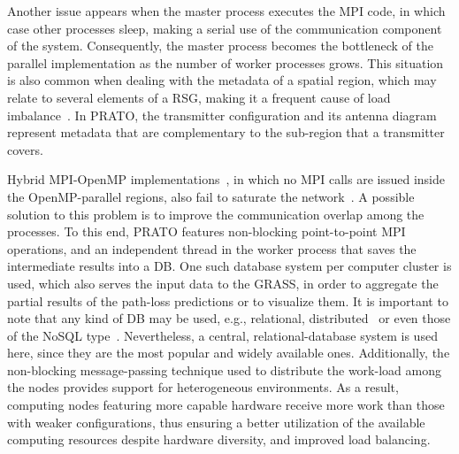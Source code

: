 Another issue appears when the master process executes the MPI code,
in which case other processes sleep, making a serial use of the communication
component of the system. Consequently, the master process becomes
the bottleneck of the parallel implementation as the number of worker
processes grows. This situation is also common when dealing with the
metadata of a spatial region, which may relate to several elements
of a RSG, making it a frequent cause of load imbalance~\cite{Gong_Parallel_agent_based_simulation_of_individual_level_spatial_interactions_within_a_multicore_computing_environment:2012,Hawick_Distributed_frameworks_and_parallel_algorithms_for_processing_large_scala_geographic_data:2003,Widener_Developing_a_parallel_computational_implementation_of_AMOEBA:2012}.
In PRATO, the transmitter configuration and its antenna diagram represent
metadata that are complementary to the sub-region that a transmitter
covers.

Hybrid MPI-OpenMP implementations~\cite{Tabik-High_performance_three_horizon_composition_algorithm_for_large_scale_terrains:2011,Tabik-Optimal_tilt_and_orientation_maps_a_multi_algorithm_approach_for_heterogeneous_multicore_GPU_systems:2013},
in which no MPI calls are issued inside the OpenMP-parallel regions,
also fail to saturate the network~\cite{Rabenseifner-Hybrid_MPI_OpenMP_parallel_programming_on_clusters_of_multicore_nodes:2009}.
A possible solution to this problem is to improve the communication
overlap among the processes. To this end, PRATO features non-blocking
point-to-point MPI operations, and an independent thread in the worker
process that saves the intermediate results into a DB. One such database
system per computer cluster is used, which also serves the input data
to the GRASS, in order to aggregate the partial results of the path-loss
predictions or to visualize them. It is important to note that any
kind of DB may be used, e.g., relational, distributed~\cite{Ozsu_Principles_of_distributed_database_systems:2011}
or even those of the NoSQL type~\cite{Stonebraker_SQL_databases_vs_NoSQL_databases:2010}.
Nevertheless, a central, relational-database system is used here,
since they are the most popular and widely available ones. Additionally,
the non-blocking message-passing technique used to distribute the
work-load among the nodes provides support for heterogeneous environments.
As a result, computing nodes featuring more capable hardware receive
more work than those with weaker configurations, thus ensuring a better
utilization of the available computing resources despite hardware
diversity, and improved load balancing.


